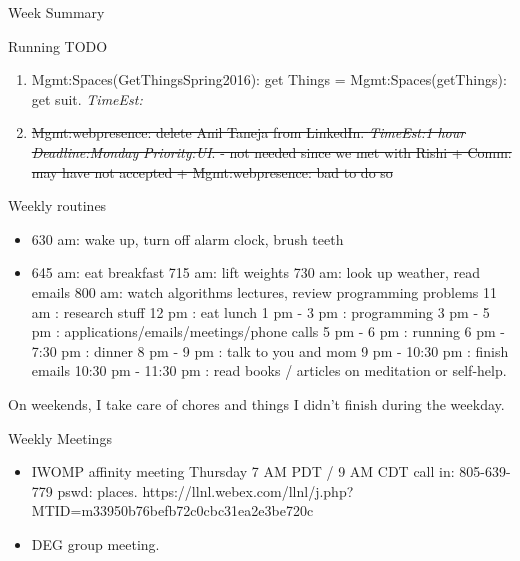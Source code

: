\documentclass[serif, mathserif, final]{beamer}
\newcommand{\doneTask}[1]{\tiny \item \tiny \sout{#1}}
\newcommand{\te}[1]{\textit{TimeEst:}\textit{#1}}
\newcommand{\dl}[1]{\textit{Deadline:}\textit{#1}}
\newcommand{\pr}[1]{\textit{Priority:}\textit{#1}}
\begin{document}
\begin{frame}
\begin{columns}
\begin{column}{0.5\linewidth}
\begin{block}{Week Summary}
\begin{block}{Running TODO}
\begin{enumerate}
      \item \tiny Mgmt:Spaces(GetThingsSpring2016): get Things =
        Mgmt:Spaces(getThings): get suit. \te{}
 
      \doneTask{Mgmt:webpresence: delete Anil Taneja from
        LinkedIn. \te{1 hour} \dl{Monday} \pr{UI}. - not needed since
        we met with Rishi  + Comm: may have not accepted +
        Mgmt:webpresence: bad to do so} 


        \end{enumerate}
      \end{block}

      
      \begin{block}{Weekly routines} 
        \begin{itemize}
          \tiny \item \tiny 630 am: wake up, turn off alarm clock, brush teeth
        \item \tiny 645 am: eat breakfast
          715 am: lift weights
          730 am: look up weather, read emails
          800 am: watch algorithms lectures, review programming problems
          11 am : research stuff
          12 pm : eat lunch
          1 pm - 3 pm : programming
          3 pm - 5 pm : applications/emails/meetings/phone calls
          5 pm  - 6 pm : running
          6 pm  - 7:30 pm : dinner
          8 pm - 9 pm : talk to you and mom
          9 pm - 10:30 pm : finish emails
          10:30 pm - 11:30 pm : read books / articles on meditation or self-help.
        \end{itemize}         
        On weekends, I take care of chores and things I didn't finish during
        the weekday. 
      \end{block} 
      
      \begin{block}{Weekly Meetings}
        \begin{itemize} 
        \item \tiny IWOMP affinity meeting Thursday 7 AM PDT / 9 AM
          CDT call in: 805-639-779 pswd: places. 
          https://llnl.webex.com/llnl/j.php?MTID=m33950b76befb72c0cbc31ea2e3be720c  
        \item \tiny DEG group meeting.  
        \end{itemize}




\end{block}
\end{block}
\end{column}
\end{columns}
\end{frame}
\end{document}
